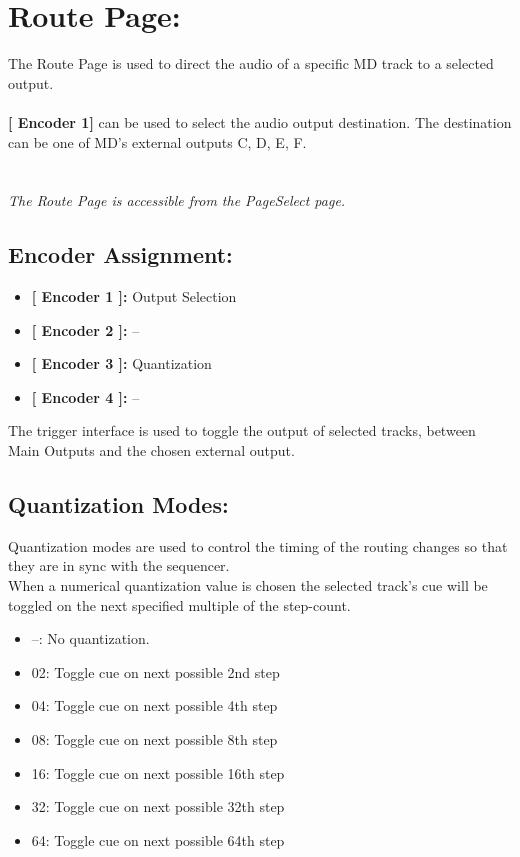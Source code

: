  \chapter{Route Page:}
 The Route Page is used to direct the audio of a specific MD track to a selected output. \\
 \\\textbf{[ Encoder 1]} can be used to select the audio output destination. The destination can be one of MD's external outputs C, D, E, F.\\

\\\\
 \textit{The Route Page is accessible from the PageSelect page.}
  \section{Encoder Assignment:}
 \begin{itemize}
 	\item \textbf{[ Encoder 1 ]: } Output Selection
 	\item \textbf{[ Encoder 2 ]: } --
 	\item \textbf{[ Encoder 3 ]: } Quantization
 	\item \textbf{[ Encoder 4 ]: } --
 \end{itemize}
  The trigger interface is used to toggle the output of selected tracks, between Main Outputs and the chosen external output.
 \section{Quantization Modes:}
 Quantization modes are used to control the timing of the routing changes so that they are in sync with the sequencer.
 \\
 When a numerical quantization value is chosen the selected track’s cue will be toggled on the next specified multiple of the step-count.
 \begin{itemize}
\item --: No quantization.
\item 02: Toggle cue on next possible 2nd step
\item 04: Toggle cue on next possible 4th step
\item 08: Toggle cue on next possible 8th step 
\item 16: Toggle cue on next possible 16th step 
\item 32: Toggle cue on next possible 32th step 
\item 64: Toggle cue on next possible 64th step
 \end{itemize}
 
 